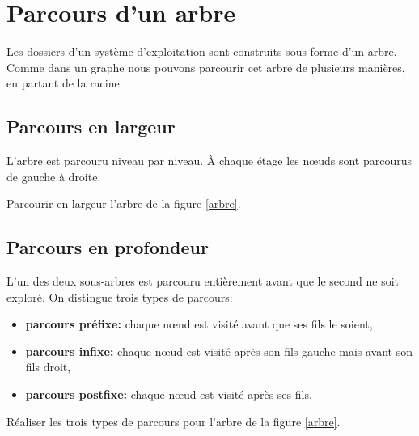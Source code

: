 \documentclass[a4paper,11pt]{article}
\begin{document}
\begin{Form}
\begin{center}
\label{arbre}
\end{center}
\section{Parcours d'un arbre}
Les dossiers d'un système d'exploitation sont construits sous forme d'un arbre. Comme dans un graphe nous pouvons parcourir cet arbre de plusieurs manières, en partant de la racine.
\subsection{Parcours en largeur}
L'arbre est parcouru niveau par niveau. À chaque étage les nœuds sont parcourus de gauche à droite.
\begin{activite}
Parcourir en largeur l'arbre de la figure \ref{arbre}.
\end{activite}
\subsection{Parcours en profondeur}
L'un des deux sous-arbres est parcouru entièrement avant que le second ne soit exploré. On distingue trois types de parcours:
\begin{itemize}
\item \textbf{parcours préfixe:} chaque nœud est visité avant que ses fils le soient,
\item \textbf{parcours infixe:} chaque nœud est visité après son fils gauche mais avant son fils droit,
\item \textbf{parcours postfixe:} chaque nœud est visité après ses fils.
\end{itemize}
\begin{activite}
Réaliser les trois types de parcours pour l'arbre de la figure \ref{arbre}.
\end{activite}

\end{Form}
\end{document}
